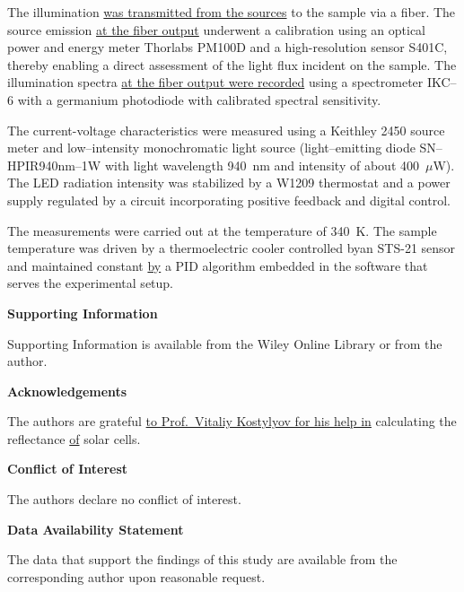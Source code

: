 \documentclass{WileyMSP-template}
\begin{document}
The illumination \textcolor[rgb]{0.00,0.07,1.00}{\uline{was transmitted from the sources}} to the sample via a fiber.
The source emission \textcolor[rgb]{0.00,0.07,1.00}{\uline{at the fiber output}} underwent a calibration using an optical power and energy meter Thorlabs PM100D and a high-resolution sensor S401C,
thereby enabling a direct assessment of the light flux incident on the sample.
The illumination spectra \textcolor[rgb]{0.00,0.07,1.00}{\uline{at the fiber output were recorded}} using a spectrometer IKC--6 with a germanium photodiode with calibrated spectral sensitivity.

The current-voltage characteristics were measured using a Keithley 2450 source meter and
low--intensity monochromatic light source (light--emitting diode SN--HPIR940nm--1W with light wavelength 940~nm and intensity of about 400~$\mu$W).
The LED radiation intensity was stabilized by a W1209 thermostat and a power supply regulated by a circuit incorporating positive feedback and digital control.

The measurements were carried out at the temperature of 340~K.
The sample temperature was driven by a thermoelectric cooler
controlled byan STS-21 sensor
and maintained constant \textcolor[rgb]{0.00,0.07,1.00}{\uline{by}} a PID algorithm embedded in the software that serves the experimental setup.


\medskip
\textbf{Supporting Information} \par %
Supporting Information is available from the Wiley Online Library or from the author.



\medskip
\textbf{Acknowledgements} \par %
The authors are grateful \textcolor[rgb]{0.00,0.07,1.00}{\uline{to Prof.~Vitaliy Kostylyov for his help in}} calculating the reflectance \textcolor[rgb]{0.00,0.07,1.00}{\uline{of}} solar cells.

\medskip
\textbf{Conflict of Interest}\par
The authors declare no conflict of interest.

\medskip
\textbf{Data Availability Statement}\par
The data that support the findings of this study are available from the corresponding author upon reasonable request.
\medskip
\end{document}
